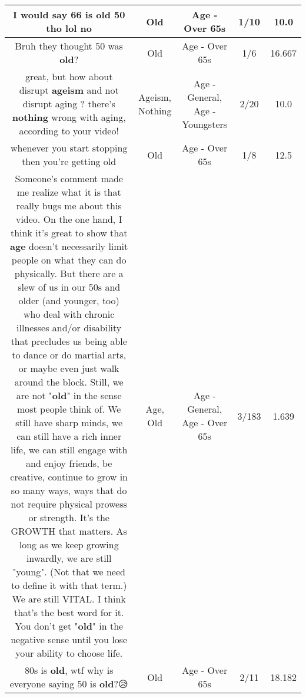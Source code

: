 \documentclass[11pt]{article}
\newlength\mylength
\begin{document}
\begin{center}
\begin{longtable}{|C{.65\mylength}|C{.30\mylength}|C{.12\mylength}|C{.12\mylength}|C{.12\mylength}|}
  \small I would say 66 is \textbf{old} 50 tho lol no\normalsize   & Old & Age - Over 65s & 1/10 & 10.0 \\  \hline
  \small Bruh they thought 50 was \textbf{old}?\normalsize   & Old & Age - Over 65s & 1/6 & 16.667 \\  \hline
  \small great, but how about disrupt \textbf{ageism} and not disrupt aging ? there's \textbf{nothing} wrong with aging, according to your video!\normalsize   & Ageism, Nothing & Age - General, Age - Youngsters & 2/20 & 10.0 \\  \hline
  \small whenever you start stopping then you're getting old\normalsize   & Old & Age - Over 65s & 1/8 & 12.5 \\  \hline
  \small Someone's comment  made me realize what it is that really bugs me about this video. On the one hand, I think it's great to show that \textbf{age} doesn't necessarily limit people on what they can do physically. But there are a slew of us in our 50s and older (and younger, too) who deal with chronic illnesses and/or disability that precludes us being able to dance or do martial arts, or maybe even just walk around the block. Still, we are not "\textbf{old}" in the sense most people think of. We still have sharp minds, we can still have a rich inner life, we can still engage with and enjoy friends, be creative, continue to grow in so many ways, ways that do not require physical prowess or strength. It's the GROWTH that matters. As long as we keep growing inwardly, we are still "young". (Not that we need to define it with that term.) We are still VITAL. I think that's the best word for it. You don't get "\textbf{old}" in the negative sense until you lose your ability to choose life.\normalsize   & Age, Old & Age - General, Age - Over 65s & 3/183 & 1.639 \\  \hline
  \small 80s is \textbf{old}, wtf why is everyone saying 50 is \textbf{old}?😥\normalsize   & Old & Age - Over 65s & 2/11 & 18.182 \\  \hline

\end{longtable}
\end{center}
\end{document}
